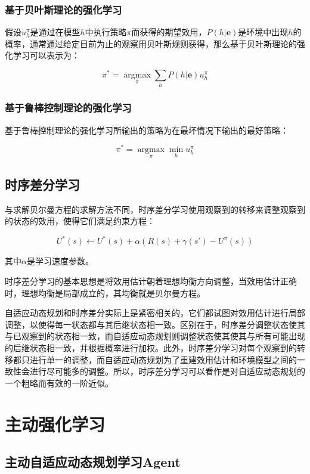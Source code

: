 \documentclass[a4paper]{ctexart}
\begin{document}
\subsubsection{基于贝叶斯理论的强化学习}

假设$u_h^\pi$是通过在模型$h$中执行策略$\pi$而获得的期望效用，$P(h|\bm e)$是环境中出现$h$的概率，通常通过给定目前为止的观察用贝叶斯规则获得，那么基于贝叶斯理论的强化学习可以表示为：

$$\pi^*=\mathop{argmax}\limits_\pi\sum_hP(h|\bm e)u_h^\pi$$

\subsubsection{基于鲁棒控制理论的强化学习}

基于鲁棒控制理论的强化学习所输出的策略为在最坏情况下输出的最好策略：

$$\pi^*=\mathop{argmax}\limits_\pi\mathop{min}\limits_h u_h^\pi$$

\subsection{时序差分学习}

与求解贝尔曼方程的求解方法不同，时序差分学习使用观察到的转移来调整观察到的状态的效用，使得它们满足约束方程：

$$U^*(s)\leftarrow U^*(s)+\alpha(R(s)+\gamma(s')-U^\pi(s))$$

其中$\alpha$是学习速度参数。

时序差分学习的基本思想是将效用估计朝着理想均衡方向调整，当效用估计正确时，理想均衡是局部成立的，其均衡就是贝尔曼方程。

自适应动态规划和时序差分实际上是紧密相关的，它们都试图对效用估计进行局部调整，以使得每一状态都与其后继状态相一致。区别在于，时序差分调整状态使其与已观察到的状态相一致，而自适应动态规划则调整状态使其使其与所有可能出现的后继状态相一致，并根据概率进行加权。此外，时序差分学习对每个观察到的转移都只进行单一的调整，而自适应动态规划为了重建效用估计和环境模型之间的一致性会进行尽可能多的调整。所以，时序差分学习可以看作是对自适应动态规划的一个粗略而有效的一阶近似。

\section{主动强化学习}

\subsection{主动自适应动态规划学习Agent}
\end{document}
